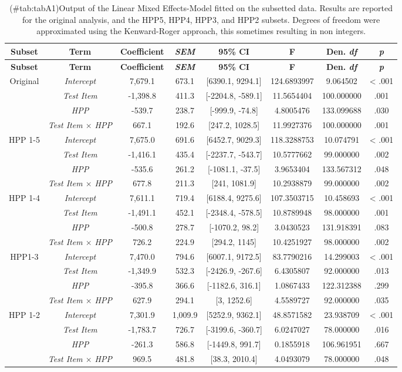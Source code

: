 \begin{appendix}
\begin{longtable}[]{@{}cccccccc@{}}
\caption{(\#tab:tabA1)Output of the Linear Mixed Effects-Model fitted on
the subsetted data. Results are reported for the original analysis, and
the HPP5, HPP4, HPP3, and HPP2 subsets. Degrees of freedom were
approximated using the Kenward-Roger approach, this sometimes resulting
in non integers.}\tabularnewline
\toprule
\textbf{Subset} & \textbf{Term} & \textbf{Coefficient} &
\textbf{\emph{SEM}} & \textbf{95\% CI} & \textbf{F} & \textbf{Den.
\emph{df}} & \textbf{\emph{p}}\tabularnewline
\midrule
\endfirsthead
\toprule
\textbf{Subset} & \textbf{Term} & \textbf{Coefficient} &
\textbf{\emph{SEM}} & \textbf{95\% CI} & \textbf{F} & \textbf{Den.
\emph{df}} & \textbf{\emph{p}}\tabularnewline
\midrule
\endhead
Original & \emph{Intercept} & 7,679.1 & 673.1 & {[}6390.1, 9294.1{]} &
124.6893997 & 9.064502 & \textless{} .001\tabularnewline
& \emph{Test Item} & -1,398.8 & 411.3 & {[}-2204.8, -589.1{]} &
11.5654404 & 100.000000 & .001\tabularnewline
& \emph{HPP} & -539.7 & 238.7 & {[}-999.9, -74.8{]} & 4.8005476 &
133.099688 & .030\tabularnewline
& \emph{Test Item \(\times\) HPP} & 667.1 & 192.6 & {[}247.2, 1028.5{]}
& 11.9927376 & 100.000000 & .001\tabularnewline
HPP 1-5 & \emph{Intercept} & 7,675.0 & 691.6 & {[}6452.7, 9029.3{]} &
118.3288753 & 10.074791 & \textless{} .001\tabularnewline
& \emph{Test Item} & -1,416.1 & 435.4 & {[}-2237.7, -543.7{]} &
10.5777662 & 99.000000 & .002\tabularnewline
& \emph{HPP} & -535.6 & 261.2 & {[}-1081.1, -37.5{]} & 3.9653404 &
133.567312 & .048\tabularnewline
& \emph{Test Item \(\times\) HPP} & 677.8 & 211.3 & {[}241, 1081.9{]} &
10.2938879 & 99.000000 & .002\tabularnewline
HPP 1-4 & \emph{Intercept} & 7,611.1 & 719.4 & {[}6188.4, 9275.6{]} &
107.3503715 & 10.458693 & \textless{} .001\tabularnewline
& \emph{Test Item} & -1,491.1 & 452.1 & {[}-2348.4, -578.5{]} &
10.8789948 & 98.000000 & .001\tabularnewline
& \emph{HPP} & -500.8 & 278.7 & {[}-1070.2, 98.2{]} & 3.0430523 &
131.918391 & .083\tabularnewline
& \emph{Test Item \(\times\) HPP} & 726.2 & 224.9 & {[}294.2, 1145{]} &
10.4251927 & 98.000000 & .002\tabularnewline
HPP1-3 & \emph{Intercept} & 7,470.0 & 794.6 & {[}6007.1, 9172.5{]} &
83.7790216 & 14.299003 & \textless{} .001\tabularnewline
& \emph{Test Item} & -1,349.9 & 532.3 & {[}-2426.9, -267.6{]} &
6.4305807 & 92.000000 & .013\tabularnewline
& \emph{HPP} & -395.8 & 366.6 & {[}-1182.6, 316.1{]} & 1.0867433 &
122.312388 & .299\tabularnewline
& \emph{Test Item \(\times\) HPP} & 627.9 & 294.1 & {[}3, 1252.6{]} &
4.5589727 & 92.000000 & .035\tabularnewline
HPP 1-2 & \emph{Intercept} & 7,301.9 & 1,009.9 & {[}5252.9, 9362.1{]} &
48.8571582 & 23.938709 & \textless{} .001\tabularnewline
& \emph{Test Item} & -1,783.7 & 726.7 & {[}-3199.6, -360.7{]} &
6.0247027 & 78.000000 & .016\tabularnewline
& \emph{HPP} & -261.3 & 586.8 & {[}-1449.8, 991.7{]} & 0.1855918 &
106.961951 & .667\tabularnewline
& \emph{Test Item \(\times\) HPP} & 969.5 & 481.8 & {[}38.3, 2010.4{]} &
4.0493079 & 78.000000 & .048\tabularnewline
\bottomrule
\end{longtable}


\end{appendix}
